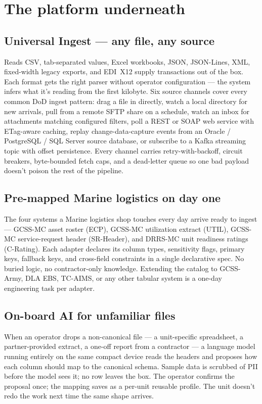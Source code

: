 \documentclass[10.5pt]{extarticle}
\begin{document}
\section*{The platform underneath}

\subsection*{Universal Ingest --- any file, any source}
Reads CSV, tab-separated values, Excel workbooks, JSON, JSON-Lines,
XML, fixed-width legacy exports, and EDI~X12 supply transactions out of
the box. Each format gets the right parser without operator
configuration --- the system infers what it's reading from the first
kilobyte. Six source channels cover every common DoD ingest pattern:
drag a file in directly, watch a local directory for new arrivals, pull
from a remote SFTP share on a schedule, watch an inbox for attachments
matching configured filters, poll a REST or SOAP web service with
ETag-aware caching, replay change-data-capture events from an Oracle /
PostgreSQL / SQL Server source database, or subscribe to a Kafka
streaming topic with offset persistence. Every channel carries
retry-with-backoff, circuit breakers, byte-bounded fetch caps, and a
dead-letter queue so one bad payload doesn't poison the rest of the
pipeline.

\subsection*{Pre-mapped Marine logistics on day one}
The four systems a Marine logistics shop touches every day arrive
ready to ingest --- GCSS-MC asset roster (ECP), GCSS-MC utilization
extract (UTIL), GCSS-MC service-request header (SR-Header), and
DRRS-MC unit readiness ratings (C-Rating). Each adapter declares its
column types, sensitivity flags, primary keys, fallback keys, and
cross-field constraints in a single declarative spec. No buried logic,
no contractor-only knowledge. Extending the catalog to GCSS-Army, DLA
EBS, TC-AIMS, or any other tabular system is a one-day engineering task
per adapter.

\subsection*{On-board AI for unfamiliar files}
When an operator drops a non-canonical file --- a unit-specific
spreadsheet, a partner-provided extract, a one-off report from a
contractor --- a language model running entirely on the same compact device
reads the headers and proposes how each column should map to the
canonical schema. Sample data is scrubbed of PII before the model sees
it; no row leaves the box. The operator confirms the proposal once;
the mapping saves as a per-unit reusable profile. The unit doesn't
redo the work next time the same shape arrives.
\end{document}

